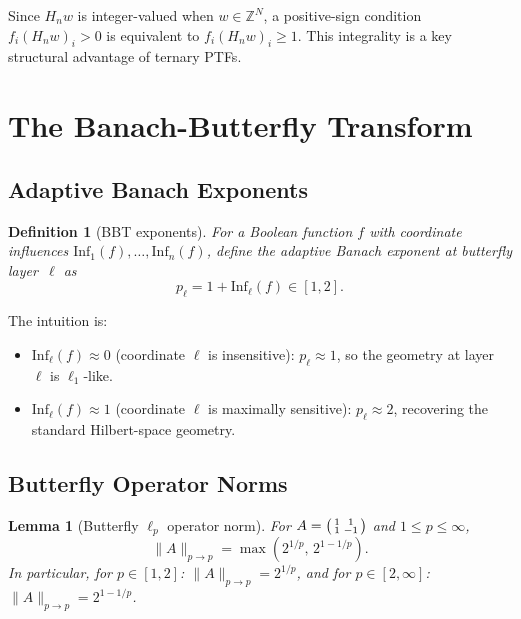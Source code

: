 \documentclass[11pt]{article}
\newtheorem{lemma}[theorem]{Lemma}
\newtheorem{definition}[theorem]{Definition}
\newcommand{\Z}{\mathbb{Z}}
\newcommand{\Inf}{\mathrm{Inf}}
\begin{document}
Since $H_n w$ is integer-valued when $w \in \Z^N$, a positive-sign condition $f_i (H_n w)_i > 0$ is equivalent to $f_i (H_n w)_i \ge 1$. This integrality is a key structural advantage of ternary PTFs.

\section{The Banach-Butterfly Transform}
\label{sec:bbt}

\subsection{Adaptive Banach Exponents}

\begin{definition}[BBT exponents]
For a Boolean function $f$ with coordinate influences $\Inf_1(f), \ldots, \Inf_n(f)$, define the \emph{adaptive Banach exponent} at butterfly layer~$\ell$ as
\[
p_\ell = 1 + \Inf_\ell(f) \in [1, 2].
\]
\end{definition}

The intuition is:
\begin{itemize}
    \item $\Inf_\ell(f) \approx 0$ (coordinate $\ell$ is insensitive): $p_\ell \approx 1$, so the geometry at layer~$\ell$ is $\ell_1$-like.
    \item $\Inf_\ell(f) \approx 1$ (coordinate $\ell$ is maximally sensitive): $p_\ell \approx 2$, recovering the standard Hilbert-space geometry.
\end{itemize}

\subsection{Butterfly Operator Norms}

\begin{lemma}[Butterfly $\ell_p$ operator norm]
\label{lem:butterfly_norm}
For $A = \begin{psmallmatrix} 1 & 1 \\ 1 & -1 \end{psmallmatrix}$ and $1 \le p \le \infty$,
\[
\|A\|_{p \to p} = \max\!\left(2^{1/p},\, 2^{1-1/p}\right).
\]
In particular, for $p \in [1, 2]$: $\|A\|_{p \to p} = 2^{1/p}$, and for $p \in [2, \infty]$: $\|A\|_{p \to p} = 2^{1-1/p}$.
\end{lemma}
\end{document}
